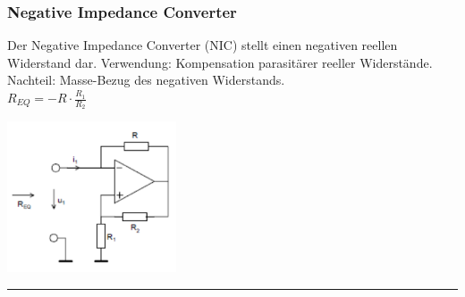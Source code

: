        	 \begin{minipage}[c]{12cm}
       	 \subsubsection{Negative Impedance Converter}
       	 	Der Negative Impedance Converter (NIC) stellt einen negativen reellen Widerstand
       	 	dar. Verwendung: Kompensation parasitärer reeller Widerstände. \\
       	 	Nachteil: Masse-Bezug des negativen Widerstands. \bigskip \\
       	 	$R_{EQ}=-R \cdot \frac{R_1}{R_2}$\\
       	 \end{minipage}
       	 \begin{minipage}[c]{5cm}
       	 	\includegraphics[width=5cm]{./images/neg-imp-conv.png}
       	 \end{minipage}
\hrule
   
